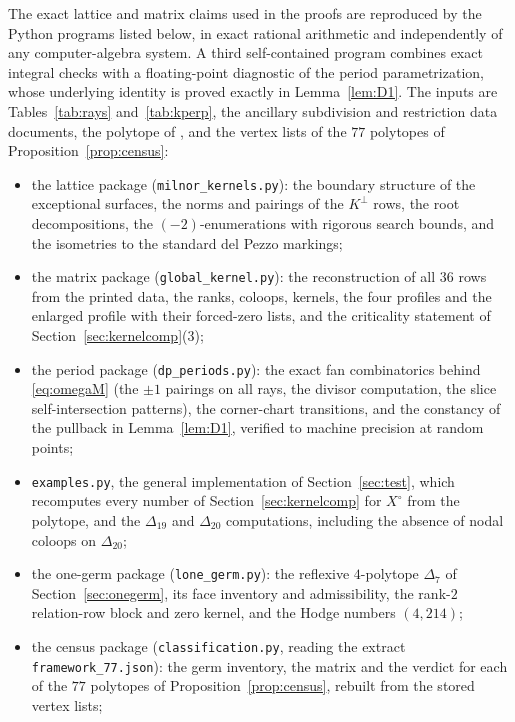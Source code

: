 \documentclass[11pt]{amsart}
\theoremstyle{definition}
\theoremstyle{remark}
\theoremstyle{plain}
\begin{document}
The exact lattice and matrix claims used in the proofs are reproduced by the
Python programs listed below, in exact rational arithmetic and independently of
any computer-algebra system.  A third self-contained
program combines exact integral checks with a floating-point diagnostic
of the period parametrization, whose underlying identity is proved
exactly in Lemma~\ref{lem:D1}.  The inputs are
Tables~\ref{tab:rays} and~\ref{tab:kperp}, the ancillary subdivision
and restriction data documents, the polytope of
\cite[Section~5.3]{PaperIII}, and the vertex lists of the $77$ polytopes
of Proposition~\ref{prop:census}:
\begin{itemize}
\item the lattice package (\texttt{milnor\_kernels.py}): the boundary structure of the exceptional
surfaces, the norms and pairings of the $K^{\perp}$ rows, the root
decompositions, the $(-2)$-enumerations with rigorous search bounds,
and the isometries to the standard del Pezzo markings;
\item the matrix package (\texttt{global\_kernel.py}): the reconstruction of all $36$ rows from
the printed data, the ranks, coloops, kernels, the four profiles and
the enlarged profile with their forced-zero lists, and the
criticality statement of Section~\ref{sec:kernelcomp}(3);
\item the period package (\texttt{dp\_periods.py}): the exact fan combinatorics behind
\eqref{eq:omegaM} (the $\pm1$ pairings on all rays, the divisor
computation, the slice self-intersection patterns), the corner-chart
transitions, and the constancy of the pullback in
Lemma~\ref{lem:D1}, verified to machine precision at random points;
\item \texttt{examples.py}, the general implementation of
Section~\ref{sec:test}, which recomputes every number of
Section~\ref{sec:kernelcomp} for $X^{\circ}$ from the polytope,
and the $\Delta_{19}$ and $\Delta_{20}$ computations, including the
absence of nodal coloops on $\Delta_{20}$;
\item the one-germ package (\texttt{lone\_germ.py}): the reflexive
$4$-polytope $\Delta_7$ of Section~\ref{sec:onegerm}, its face
inventory and admissibility, the rank-$2$ relation-row block and zero
kernel, and the Hodge numbers $(4,214)$;
\item the census package (\texttt{classification.py}, reading the
extract \texttt{framework\_77.json}): the germ inventory, the matrix and
the verdict for each of the $77$ polytopes of
Proposition~\ref{prop:census}, rebuilt from the stored vertex lists;

\end{itemize}
\end{document}
